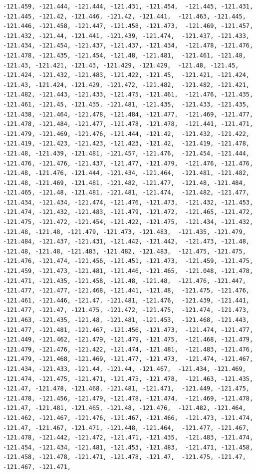 \documentclass[
]{article}
\begin{document}
\begin{verbatim}
-121.459, -121.444, -121.444, -121.431, -121.454,  -121.445, -121.431, -121.445, -121.42, -121.446, -121.42, -121.441,  -121.463, -121.445, -121.446, -121.458, -121.447, -121.458, -121.473,  -121.469, -121.457, -121.432, -121.44, -121.441, -121.439, -121.474,  -121.437, -121.433, -121.434, -121.454, -121.437, -121.437, -121.434,  -121.478, -121.476, -121.478, -121.435, -121.454, -121.48, -121.481,  -121.461, -121.48, -121.43, -121.421, -121.43, -121.429, -121.429,  -121.48, -121.45, -121.424, -121.432, -121.483, -121.422, -121.45,  -121.421, -121.424, -121.43, -121.424, -121.429, -121.472, -121.482,  -121.482, -121.421, -121.482, -121.443, -121.433, -121.475, -121.461,  -121.476, -121.435, -121.461, -121.45, -121.435, -121.481, -121.435,  -121.433, -121.435, -121.438, -121.464, -121.478, -121.484, -121.477,  -121.469, -121.477, -121.478, -121.484, -121.477, -121.478, -121.478,  -121.441, -121.471, -121.479, -121.469, -121.476, -121.444, -121.42,  -121.432, -121.422, -121.419, -121.423, -121.423, -121.423, -121.42,  -121.419, -121.478, -121.48, -121.439, -121.481, -121.457, -121.476,  -121.454, -121.444, -121.476, -121.476, -121.437, -121.477, -121.479,  -121.476, -121.476, -121.48, -121.476, -121.444, -121.434, -121.464,  -121.481, -121.482, -121.48, -121.469, -121.481, -121.482, -121.477,  -121.48, -121.484, -121.465, -121.48, -121.481, -121.481, -121.474,  -121.482, -121.477, -121.434, -121.434, -121.474, -121.476, -121.473,  -121.432, -121.453, -121.474, -121.432, -121.483, -121.479, -121.472,  -121.465, -121.472, -121.475, -121.472, -121.454, -121.422, -121.475,  -121.434, -121.432, -121.48, -121.48, -121.479, -121.473, -121.483,  -121.435, -121.479, -121.484, -121.437, -121.431, -121.442, -121.442,  -121.473, -121.48, -121.48, -121.48, -121.483, -121.482, -121.483,  -121.475, -121.475, -121.476, -121.474, -121.456, -121.451, -121.473,  -121.459, -121.475, -121.459, -121.473, -121.481, -121.446, -121.465,  -121.048, -121.478, -121.471, -121.435, -121.458, -121.48, -121.48,  -121.476, -121.447, -121.477, -121.477, -121.468, -121.441, -121.48,  -121.475, -121.476, -121.461, -121.446, -121.47, -121.481, -121.476,  -121.439, -121.441, -121.477, -121.47, -121.475, -121.472, -121.475,  -121.474, -121.473, -121.463, -121.435, -121.48, -121.481, -121.453,  -121.468, -121.443, -121.477, -121.481, -121.467, -121.456, -121.473,  -121.474, -121.477, -121.449, -121.462, -121.479, -121.479, -121.475,  -121.468, -121.479, -121.479, -121.476, -121.422, -121.474, -121.481,  -121.483, -121.476, -121.479, -121.468, -121.469, -121.477, -121.473,  -121.474, -121.467, -121.434, -121.433, -121.44, -121.44, -121.467,  -121.434, -121.469, -121.474, -121.475, -121.471, -121.475, -121.478,  -121.463, -121.435, -121.47, -121.478, -121.468, -121.481, -121.471,  -121.449, -121.475, -121.478, -121.456, -121.479, -121.478, -121.474,  -121.469, -121.478, -121.47, -121.481, -121.465, -121.48, -121.476,  -121.482, -121.464, -121.462, -121.467, -121.476, -121.467, -121.466,  -121.473, -121.474, -121.47, -121.467, -121.471, -121.448, -121.464,  -121.477, -121.467, -121.478, -121.442, -121.472, -121.471, -121.435,  -121.483, -121.474, -121.454, -121.434, -121.481, -121.453, -121.483,  -121.471, -121.458, -121.458, -121.478, -121.471, -121.478, -121.47,  -121.475, -121.47, -121.467, -121.471, 
\end{verbatim}
\end{document}
